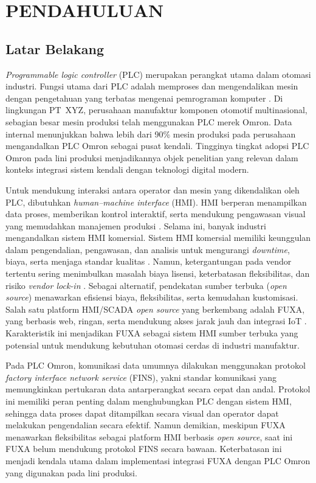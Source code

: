 \chapter{PENDAHULUAN}

\section{Latar Belakang}

\textit{Programmable logic controller} (PLC) merupakan perangkat utama dalam otomasi industri. Fungsi utama dari PLC adalah memproses dan mengendalikan mesin dengan pengetahuan yang terbatas mengenai pemrograman komputer \parencite{koondhar2023role}. Di lingkungan PT~XYZ, perusahaan manufaktur komponen otomotif multinasional, sebagian besar mesin produksi telah menggunakan PLC merek Omron. Data internal menunjukkan bahwa lebih dari 90\% mesin produksi pada perusahaan mengandalkan PLC Omron sebagai pusat kendali. Tingginya tingkat adopsi PLC Omron pada lini produksi menjadikannya objek penelitian yang relevan dalam konteks integrasi sistem kendali dengan teknologi digital modern.

Untuk mendukung interaksi antara operator dan mesin yang dikendalikan oleh PLC, dibutuhkan \textit{human--machine interface} (HMI). HMI berperan menampilkan data proses, memberikan kontrol interaktif, serta mendukung pengawasan visual yang memudahkan manajemen produksi \parencite{mujawar2023_hmi_intro}. Selama ini, banyak industri mengandalkan sistem HMI komersial. Sistem HMI komersial memiliki keunggulan dalam pengendalian, pengawasan, dan analisis untuk mengurangi \textit{downtime}, biaya, serta menjaga standar kualitas \parencite{sawal_scada_market_2025}. Namun, ketergantungan pada vendor tertentu sering menimbulkan masalah biaya lisensi, keterbatasan fleksibilitas, dan risiko \textit{vendor lock-in} \parencite{Gularte2025OpenVsProprietary}. Sebagai alternatif, pendekatan sumber terbuka (\textit{open source}) menawarkan efisiensi biaya, fleksibilitas, serta kemudahan kustomisasi. Salah satu platform HMI/SCADA \textit{open source} yang berkembang adalah FUXA, yang berbasis web, ringan, serta mendukung akses jarak jauh dan integrasi IoT \parencite{chen_open_source_web_scada_2025}. Karakteristik ini menjadikan FUXA sebagai sistem HMI sumber terbuka yang potensial untuk mendukung kebutuhan otomasi cerdas di industri manufaktur.

Pada PLC Omron, komunikasi data umumnya dilakukan menggunakan protokol \textit{factory interface network service} (FINS), yakni standar komunikasi yang memungkinkan pertukaran data antarperangkat secara cepat dan andal. Protokol ini memiliki peran penting dalam menghubungkan PLC dengan sistem HMI, sehingga data proses dapat ditampilkan secara visual dan operator dapat melakukan pengendalian secara efektif. Namun demikian, meskipun FUXA menawarkan fleksibilitas sebagai platform HMI berbasis \textit{open source}, saat ini FUXA belum mendukung protokol FINS secara bawaan. Keterbatasan ini menjadi kendala utama dalam implementasi integrasi FUXA dengan PLC Omron yang digunakan pada lini produksi.


